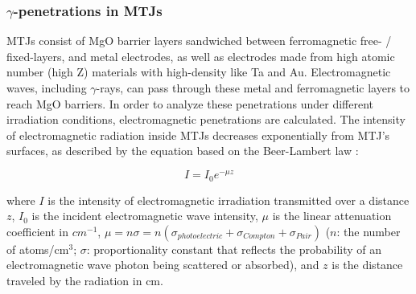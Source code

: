 \documentclass[molecules,review,submit,pdftex,moreauthors]{Definitions/mdpi}
\begin{document}


\subsubsection{$\gamma$-penetrations in MTJs}

   
MTJs consist of MgO barrier layers sandwiched between ferromagnetic free- / fixed-layers, and metal electrodes, as well as electrodes made from high atomic number (high Z) materials with high-density like Ta and Au.  Electromagnetic waves, including $\gamma$-rays, can pass through these metal and ferromagnetic layers to reach MgO barriers.  In order to analyze these penetrations under different irradiation conditions, electromagnetic penetrations are calculated. The intensity of electromagnetic radiation inside MTJs decreases exponentially from MTJ's surfaces, as described by the equation based on the Beer-Lambert law \cite{Gerward1996RPC,Baur2019RSI}:


\begin{equation}
    I = I_0 e^{- \mu z}
   \label{Equ:attenuation}
\end{equation}


\noindent where $I$ is the intensity of electromagnetic irradiation transmitted over a distance $z$, $I_0$ is the incident electromagnetic wave intensity, $\mu$ is the linear attenuation coefficient in $cm^{-1}$, $\mu = n \sigma = n (\sigma_{photoelectric} + \sigma_{Compton} + \sigma_{Pair})$ ($n$: the number of atoms/cm$^3$; $\sigma$: proportionality constant that reflects the probability of an electromagnetic wave photon being scattered or absorbed), and $z$ is the distance traveled by the radiation in cm.  
\end{document}
